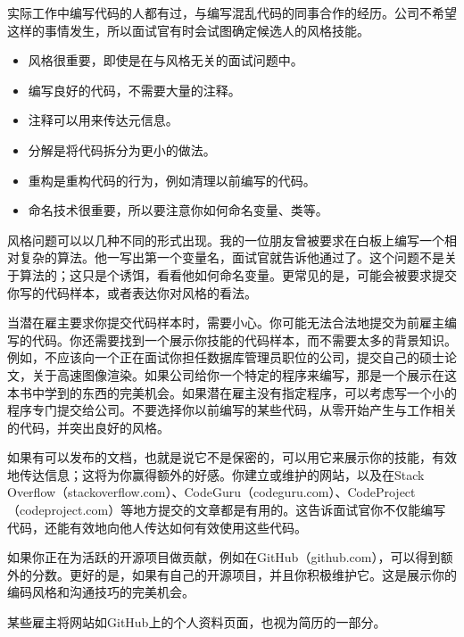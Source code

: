 
实际工作中编写代码的人都有过，与编写混乱代码的同事合作的经历。公司不希望这样的事情发生，所以面试官有时会试图确定候选人的风格技能。


\begin{itemize}
\item
风格很重要，即使是在与风格无关的面试问题中。

\item
编写良好的代码，不需要大量的注释。

\item
注释可以用来传达元信息。

\item
分解是将代码拆分为更小的做法。

\item
重构是重构代码的行为，例如清理以前编写的代码。

\item
命名技术很重要，所以要注意你如何命名变量、类等。
\end{itemize}


风格问题可以以几种不同的形式出现。我的一位朋友曾被要求在白板上编写一个相对复杂的算法。他一写出第一个变量名，面试官就告诉他通过了。这个问题不是关于算法的；这只是个诱饵，看看他如何命名变量。更常见的是，可能会被要求提交你写的代码样本，或者表达你对风格的看法。

当潜在雇主要求你提交代码样本时，需要小心。你可能无法合法地提交为前雇主编写的代码。你还需要找到一个展示你技能的代码样本，而不需要太多的背景知识。例如，不应该向一个正在面试你担任数据库管理员职位的公司，提交自己的硕士论文，关于高速图像渲染。如果公司给你一个特定的程序来编写，那是一个展示在这本书中学到的东西的完美机会。如果潜在雇主没有指定程序，可以考虑写一个小的程序专门提交给公司。不要选择你以前编写的某些代码，从零开始产生与工作相关的代码，并突出良好的风格。

如果有可以发布的文档，也就是说它不是保密的，可以用它来展示你的技能，有效地传达信息；这将为你赢得额外的好感。你建立或维护的网站，以及在Stack Overflow（stackoverflow.com）、CodeGuru（codeguru.com）、CodeProject（codeproject.com）等地方提交的文章都是有用的。这告诉面试官你不仅能编写代码，还能有效地向他人传达如何有效使用这些代码。

如果你正在为活跃的开源项目做贡献，例如在GitHub（github.com），可以得到额外的分数。更好的是，如果有自己的开源项目，并且你积极维护它。这是展示你的编码风格和沟通技巧的完美机会。

某些雇主将网站如GitHub上的个人资料页面，也视为简历的一部分。













